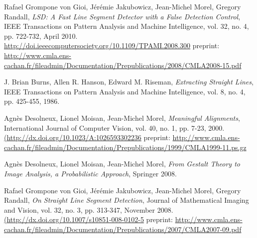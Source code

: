 \documentclass{ipol}
\begin{document}
\begin{thebibliography}{9}

   Rafael Grompone von Gioi, J\'er\'emie Jakubowicz,
  Jean-Michel Morel, Gregory Randall, \emph{LSD: A Fast Line Segment
  Detector with a False Detection Control}, IEEE Transactions on
  Pattern Analysis and Machine Intelligence, vol. 32, no. 4,
  pp. 722-732, April 2010.
  \url{http://doi.ieeecomputersociety.org/10.1109/TPAMI.2008.300}
  preprint: \url{http://www.cmla.ens-cachan.fr/fileadmin/Documentation/Prepublications/2008/CMLA2008-15.pdf}

    J. Brian Burns, Allen R. Hanson, Edward
   M. Riseman, \emph{Extracting Straight Lines}, IEEE Transactions on
   Pattern Analysis and Machine Intelligence, vol. 8, no. 4,
   pp. 425-455, 1986.

    Agn\`es Desolneux, Lionel Moisan, Jean-Michel
   Morel, \emph{Meaningful Alignments}, International Journal of
   Computer Vision, vol. 40, no. 1, pp. 7-23, 2000.
   \url{(http://dx.doi.org/10.1023/A:1026593302236}
   preprint: \url{http://www.cmla.ens-cachan.fr/fileadmin/Documentation/Prepublications/1999/CMLA1999-11.ps.gz}

    Agn\`es Desolneux, Lionel Moisan, Jean-Michel
   Morel, \emph{From Gestalt Theory to Image Analysis, a Probabilistic
   Approach}, Springer 2008.

    Rafael Grompone von Gioi, J\'er\'emie
   Jakubowicz, Jean-Michel Morel, Gregory Randall, \emph{On Straight
   Line Segment Detection}, Journal of Mathematical Imaging and
   Vision, vol. 32, no. 3, pp. 313-347, November 2008.
   \url{(http://dx.doi.org/10.1007/s10851-008-0102-5}
   preprint: \url{http://www.cmla.ens-cachan.fr/fileadmin/Documentation/Prepublications/2007/CMLA2007-09.pdf}

\end{thebibliography}
\end{document}
